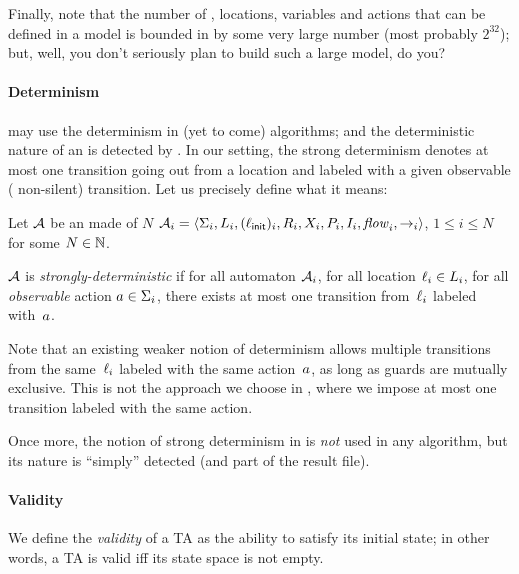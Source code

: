 
Finally, note that the number of \IPTA{}, locations, variables and actions that can be defined in a model is bounded in \imitator{} by some very large number (most probably $2^{32}$); but, well, you don't seriously plan to build such a large model, do you?


\paragraph{Determinism}
\imitator{} may use the determinism in (yet to come) algorithms; and the deterministic nature of an \NIPTA{} is detected by \imitator{}.
In our setting, the strong determinism denotes at most one transition going out from a location and labeled with a given observable (\ie{} non-silent) transition.
Let us precisely define what it means:

\begin{definition}
	Let $\mathcal{A}$ be an \NIPTA{} made of $N$ \IPTA{} $\mathcal{A}_i = \langle\Sigma_i, L_i, (\ell_{\textsf{init}})_i, R_i, X_i, P_i, I_i, \mathit{flow}_i, {\rightarrow}_i\rangle$, $1 \leq i \leq N$ for some $N \in \mathbb N$.

	$\mathcal{A}$ is \emph{strongly-deterministic} if
	for all automaton $\mathcal{A}_i$,
	for all location $\ell_i \in L_i$,
	for all \emph{observable} action $a \in \Sigma_i$,
	there exists at most one transition from~$\ell_i$ labeled with~$a$.
\end{definition}

Note that an existing weaker notion of determinism allows multiple transitions from the same~$\ell_i$ labeled with the same action~$a$, as long as guards are mutually exclusive.
This is not the approach we choose in \imitator{}, where we impose at most one transition labeled with the same action.

Once more, the notion of strong determinism in \imitator{} is \emph{not} used in any algorithm, but its nature is ``simply'' detected (and part of the result file).


\paragraph{Validity}
We define the \emph{validity} of a TA as the ability to satisfy its initial state; in other words, a TA is valid iff its state space is not empty.

